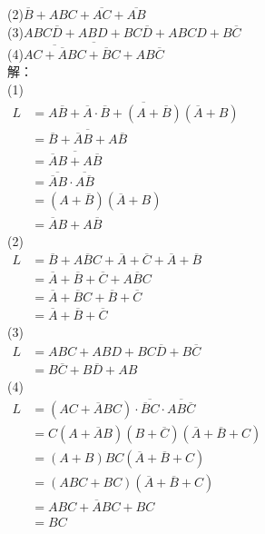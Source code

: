 \documentclass[a4paper,11pt,UTF8]{article}
\begin{document}
(2)$\overline{B}+ABC+\overline{AC}+\overline{AB}$\\
(3)${ABC}{\overline{D}+ABD+BC}{\overline{D}+ABCD+B}{\overline{C}}$\\
(4)$\overline{{\overline{AC+\overline{A}BC}+\overline{B}C+AB\overline{C}}}$\\
解：\\
(1)\\
$\begin{aligned}
	L&=\overline{A\overline{B}+\overline{A}\cdot\overline{B}+(A+\overline{B})(\overline{A}+B)}\\
	&=\overline{\overline{B}+\overline{A}B+A\overline{B}}\\
	&=\overline{\overline{A}B+A\overline{B}}\\
	&=\overline{\overline{A}B}\cdot\overline{A\overline{B}}\\
	&=(A+\overline{B})(\overline{A}+B)\\
	&=\overline{A}B+A\overline{B}
\end{aligned}$\\
(2)\\
$\begin{aligned}
	L&=\overline{B}+A\overline{B}C+\overline{A}+\overline{C}+\overline{A}+\overline{B}\\
	&=\overline{A}+\overline{B}+\overline{C}+A\overline{B}C\\
	&=\overline{A}+\overline{B}C+\overline{B}+\overline{C}\\
	&=\overline{A}+\overline{B}+\overline{C}
\end{aligned}$\\
(3)\\
$\begin{aligned}
	L&=ABC+ABD+BC\overline{D}+B\overline{C}\\
	&=B\overline{C}+B\overline{D}+AB
\end{aligned}$\\
(4)\\
$\begin{aligned}
	L&=(AC+\overline{A}BC)\cdot\overline{\overline{B}C}\cdot\overline{AB\overline{C}}\\
	&=C(A+\overline{A}B)(B+\overline{C})(\overline{A}+\overline{B}+C)\\
	&=(A+B)BC(\overline{A}+\overline{B}+C)\\
	&=(ABC+BC)(\overline{A}+\overline{B}+C)\\
	&=ABC+\overline{A}BC+BC\\
	&=BC
\end{aligned}$\\
\end{document}
